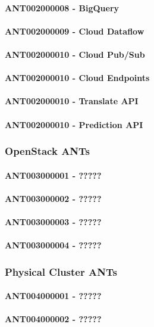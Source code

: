 \documentclass{acm_proc_article-sp}
\begin{document}
\paragraph{ANT002000008 - BigQuery}
\paragraph{ANT002000009 - Cloud Dataflow}
\paragraph{ANT002000010 - Cloud Pub/Sub}
\paragraph{ANT002000010 - Cloud Endpoints}
\paragraph{ANT002000010 - Translate API}
\paragraph{ANT002000010 - Prediction API}
\subsubsection{OpenStack ANTs}
\paragraph{ANT003000001 - ?????}
\paragraph{ANT003000002 - ?????}
\paragraph{ANT003000003 - ?????}
\paragraph{ANT003000004 - ?????}
\subsubsection{Physical Cluster ANTs}
\paragraph{ANT004000001 - ?????}
\paragraph{ANT004000002 - ?????}
\end{document}
